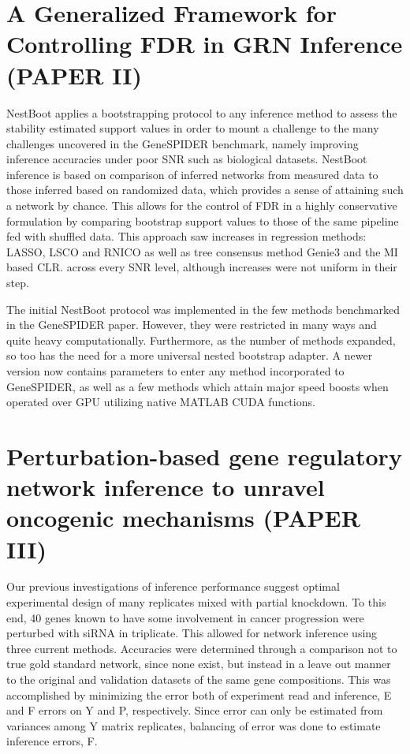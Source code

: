 \section{A Generalized Framework for Controlling FDR in GRN Inference (PAPER II)}

NestBoot applies a bootstrapping protocol to any inference method to assess the stability estimated support values in order to mount a challenge to the many challenges uncovered in the GeneSPIDER benchmark, namely improving inference accuracies under poor SNR such as biological datasets. NestBoot inference is based on comparison of inferred networks from measured data to those inferred based on randomized data, which provides a sense of attaining such a network by chance. This allows for the control of FDR in a highly conservative formulation by comparing bootstrap support values to those of the same pipeline fed with shuffled data. This approach saw increases in regression methods: LASSO, LSCO and RNICO as well as tree consensus method Genie3 and the MI based CLR. across every SNR level, although increases were not uniform in their step.

The initial NestBoot protocol was implemented in the few methods benchmarked in the GeneSPIDER paper. However, they were restricted in many ways and quite heavy computationally. Furthermore, as the number of methods expanded, so too has the need for a more universal nested bootstrap adapter. A newer version now contains parameters to enter any method incorporated to GeneSPIDER, as well as a few methods which attain major speed boosts when operated over GPU utilizing native MATLAB CUDA functions. 

\section{Perturbation-based gene regulatory network inference to unravel oncogenic mechanisms (PAPER III)}

Our previous investigations of inference performance suggest optimal experimental design of many replicates mixed with partial knockdown. To this end, 40 genes known to have some involvement in cancer progression were perturbed with siRNA in triplicate. This allowed for network inference using three current methods. Accuracies were determined through a comparison not to true gold standard network, since none exist, but instead in a leave out manner to the original and validation datasets of the same gene compositions. This was accomplished by minimizing the error both of experiment read and inference, \ie E and F errors on Y and P, respectively. Since error can only be estimated from variances among Y matrix replicates, balancing of error was done to estimate inference errors, F.

